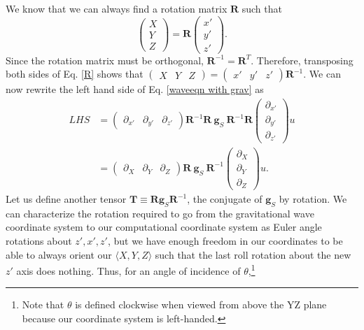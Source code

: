 \documentclass{article}
\begin{document}
We know that we can always find a rotation matrix $\textbf{R}$ such that
\begin{equation} \label{R}
\begin{pmatrix}
X \\
Y \\
Z
\end{pmatrix}=\textbf{R}\begin{pmatrix}
x' \\
y' \\
z'
\end{pmatrix}.
\end{equation} Since the rotation matrix must be orthogonal, $\textbf{R}^{-1}=\textbf{R}^T$. Therefore, transposing both sides of Eq. \ref{R} shows that $\begin{pmatrix} X & Y & Z\end{pmatrix} = \begin{pmatrix}x' & y' & z'\end{pmatrix}\textbf{R}^{-1}.$ We can now rewrite the left hand side of Eq. \ref{waveeqn with grav} as
\begin{align}
LHS &= \begin{pmatrix}\partial_{x'} & \partial_{y'} & \partial_{z'}\end{pmatrix} 
\textbf{R}^{-1}\textbf{R} \  \textbf{g}_S \ \textbf{R}^{-1}\textbf{R}
\begin{pmatrix} \partial_{x'} \\ \partial_{y'} \\ \partial_{z'} \end{pmatrix}
u \nonumber \\
&= \begin{pmatrix}\partial_X & \partial_Y & \partial_Z\end{pmatrix}
\textbf{R} \  \textbf{g}_S \ \textbf{R}^{-1}
\begin{pmatrix} \partial_X \\ \partial_Y \\ \partial_Z \end{pmatrix}
u. \label{LHS}
\end{align}
Let us define another tensor $\textbf{T}\equiv\textbf{Rg}_S\textbf{R}^{-1}$, the conjugate of $\textbf{g}_S$ by rotation. We can characterize the rotation required to go from the gravitational wave coordinate system to our computational coordinate system as Euler angle rotations about $z',x',z'$, but we have enough freedom in our coordinates to be able to always orient our $\langle X,Y,Z\rangle$ such that the last roll rotation about the new $z'$ axis does nothing. Thus, for an angle of incidence of $\theta$,\footnote{Note that $\theta$ is defined clockwise when viewed from above the YZ plane because our coordinate system is left-handed.}
\end{document}

